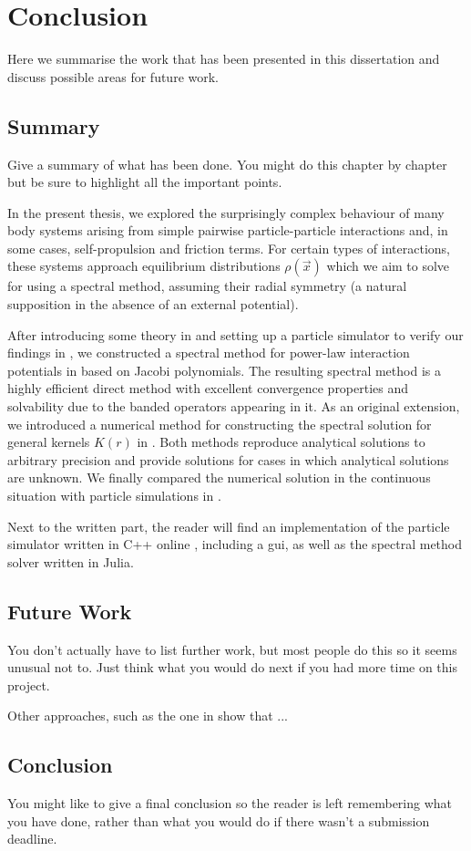\chapter{Conclusion}
\label{chap:conclusion}

Here we summarise the work that has been presented in this dissertation and discuss
possible areas for future work.

\section{Summary}
Give a summary of what has been done. You might do this chapter by chapter but be sure to highlight all the important points.

In the present thesis, we explored the surprisingly complex behaviour of many body systems arising from simple pairwise particle-particle interactions and, in some cases, self-propulsion and friction terms.
For certain types of interactions, these systems approach equilibrium distributions $\rho(\vec{x})$ which we aim to solve for using a spectral method, assuming their radial symmetry (a natural supposition in the absence of an external potential).

After introducing some theory in  and setting up a particle simulator to verify our findings in , we constructed a spectral method for power-law interaction potentials in  based on Jacobi polynomials.
The resulting spectral method is a highly efficient direct method with excellent convergence properties and solvability due to the banded operators appearing in it.
As an original extension, we introduced a numerical method for constructing the spectral solution for general kernels $K(r)$ in .
Both methods reproduce analytical solutions to arbitrary precision and provide solutions for cases in which analytical solutions are unknown.
We finally compared the numerical solution in the continuous situation with particle simulations in .

Next to the written part, the reader will find an implementation of the particle simulator written in C++ online \parencite{2023-my-dissertation}, including a \gls{gui}, as well as the spectral method solver written in Julia.

\section{Future Work}
You don't actually have to list further work, but most people do this so it seems unusual not to. Just think what you would do next if you had more time on this project.

Other approaches, such as the one in \cite{2015-spectral-method-for-boltzmann-equation} show that ...

\section{Conclusion}
You might like to give a final conclusion so the reader is left remembering what you have done, rather than what you would do if there wasn't a submission deadline.
